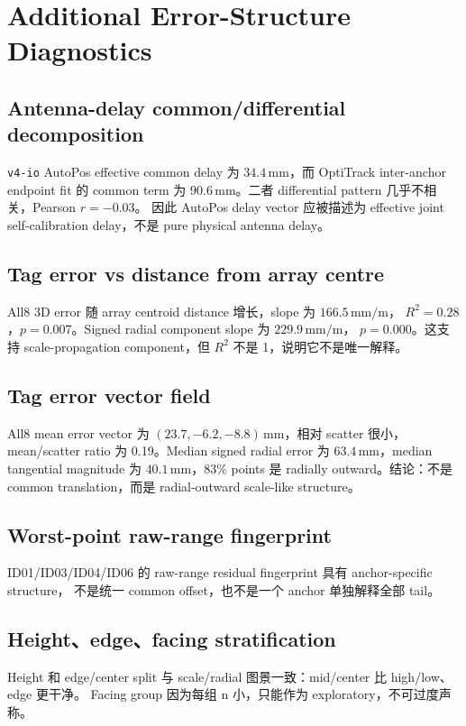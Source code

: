 \documentclass[11pt,a4paper]{article}
\newcommand{\mm}{\,\si{\milli\meter}}
\begin{document}
\section{Additional Error-Structure Diagnostics}
\label{sec:errstruct}

\subsection{Antenna-delay common/differential decomposition}
\label{sec:delay}
\texttt{v4-io} AutoPos effective common delay 为 $34.4\mm$，而 OptiTrack inter-anchor endpoint
fit 的 common term 为 $90.6\mm$。二者 differential pattern 几乎不相关，Pearson $r=-0.03$。
因此 AutoPos delay vector 应被描述为 effective joint self-calibration delay，不是 pure
physical antenna delay。

\subsection{Tag error vs distance from array centre}
All8 3D error 随 array centroid distance 增长，slope 为 $166.5\mm/\text{m}$，
$R^2=0.28$，$p=0.007$。Signed radial component slope 为 $229.9\mm/\text{m}$，
$p=0.000$。这支持 scale-propagation component，但 $R^2$ 不是 1，说明它不是唯一解释。

\subsection{Tag error vector field}
All8 mean error vector 为 $(23.7,-6.2,-8.8)\mm$，相对 scatter 很小，mean/scatter ratio
为 0.19。Median signed radial error 为 $63.4\mm$，median tangential magnitude 为
$40.1\mm$，83\% points 是 radially outward。结论：不是 common translation，而是
radial-outward scale-like structure。

\subsection{Worst-point raw-range fingerprint}
ID01/ID03/ID04/ID06 的 raw-range residual fingerprint 具有 anchor-specific structure，
不是统一 common offset，也不是一个 anchor 单独解释全部 tail。

\subsection{Height、edge、facing stratification}
Height 和 edge/center split 与 scale/radial 图景一致：mid/center 比 high/low、edge 更干净。
Facing group 因为每组 n 小，只能作为 exploratory，不可过度声称。
\end{document}
